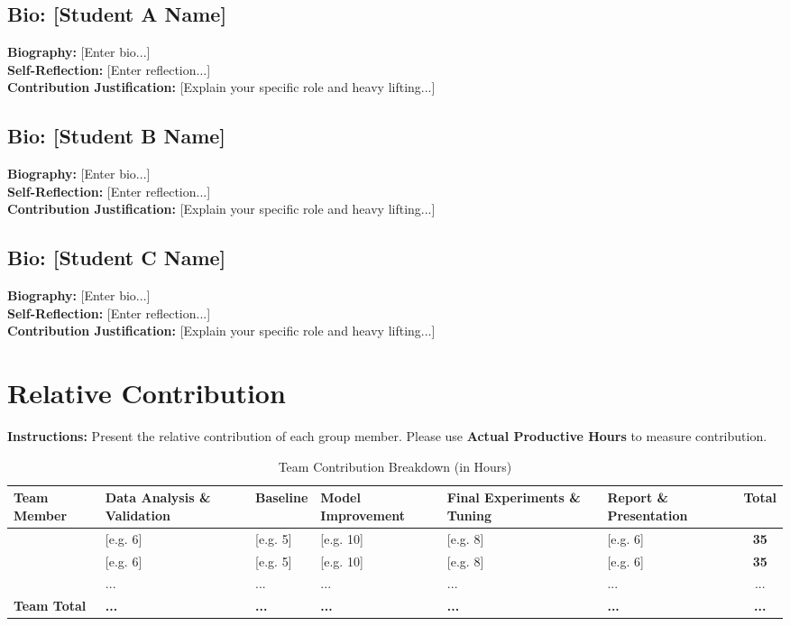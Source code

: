 \documentclass[journal]{IEEEtran}
\begin{document}
\subsection{Bio: [Student A Name]}
\textbf{Biography:} [Enter bio...] \\
\textbf{Self-Reflection:} [Enter reflection...] \\
\textbf{Contribution Justification:} [Explain your specific role and heavy lifting...]

\subsection{Bio: [Student B Name]}
\textbf{Biography:} [Enter bio...] \\
\textbf{Self-Reflection:} [Enter reflection...] \\
\textbf{Contribution Justification:} [Explain your specific role and heavy lifting...]

\subsection{Bio: [Student C Name]}
\textbf{Biography:} [Enter bio...] \\
\textbf{Self-Reflection:} [Enter reflection...] \\
\textbf{Contribution Justification:} [Explain your specific role and heavy lifting...]

\section{Relative Contribution}
\label{sec:contribution}

\textbf{Instructions:} Present the relative contribution of each group member.
Please use \textbf{Actual Productive Hours} to measure contribution.

\begin{table}[h]
\caption{Team Contribution Breakdown (in Hours)}
\label{tab:contributions}
\centering
\renewcommand{\arraystretch}{1.3}
\begin{tabularx}{0.9\textwidth}{|l|X|X|X|X|X|c|}
\hline
\textbf{Team Member} & \textbf{Data Analysis \& Validation} & \textbf{Baseline} & \textbf{Model Improvement} & \textbf{Final Experiments \& Tuning} & \textbf{Report \& Presentation} & \textbf{Total} \\
\hline
[Student A Name] & [e.g. 6] & [e.g. 5] & [e.g. 10] & [e.g. 8] & [e.g. 6] & \textbf{35} \\
\hline
[Student B Name] & [e.g. 6] & [e.g. 5] & [e.g. 10] & [e.g. 8] & [e.g. 6] & \textbf{35} \\
\hline
[Student C Name] & ... & ... & ... & ... & ... & ... \\
\hline
\textbf{Team Total} & \textbf{...} & \textbf{...} & \textbf{...} & \textbf{...} & \textbf{...} & \textbf{...} \\
\hline
\end{tabularx}
\end{table}
\end{document}
